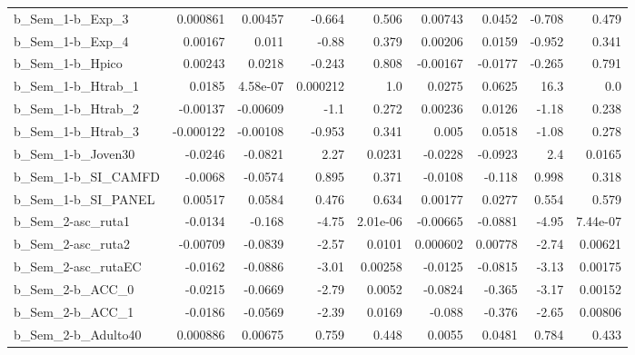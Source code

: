 \begin{tabular}{lrrrrrrrr}
b\_Sem\_1-b\_Exp\_3            &    0.000861 &      0.00457 &    -0.664 &    0.506 &    0.00743 &      0.0452 &       -0.708 &         0.479 \\
b\_Sem\_1-b\_Exp\_4            &     0.00167 &        0.011 &     -0.88 &    0.379 &    0.00206 &      0.0159 &       -0.952 &         0.341 \\
b\_Sem\_1-b\_Hpico            &     0.00243 &       0.0218 &    -0.243 &    0.808 &   -0.00167 &     -0.0177 &       -0.265 &         0.791 \\
b\_Sem\_1-b\_Htrab\_1          &      0.0185 &     4.58e-07 &  0.000212 &      1.0 &     0.0275 &      0.0625 &         16.3 &           0.0 \\
b\_Sem\_1-b\_Htrab\_2          &    -0.00137 &     -0.00609 &      -1.1 &    0.272 &    0.00236 &      0.0126 &        -1.18 &         0.238 \\
b\_Sem\_1-b\_Htrab\_3          &   -0.000122 &     -0.00108 &    -0.953 &    0.341 &      0.005 &      0.0518 &        -1.08 &         0.278 \\
b\_Sem\_1-b\_Joven30          &     -0.0246 &      -0.0821 &      2.27 &   0.0231 &    -0.0228 &     -0.0923 &          2.4 &        0.0165 \\
b\_Sem\_1-b\_SI\_CAMFD         &     -0.0068 &      -0.0574 &     0.895 &    0.371 &    -0.0108 &      -0.118 &        0.998 &         0.318 \\
b\_Sem\_1-b\_SI\_PANEL         &     0.00517 &       0.0584 &     0.476 &    0.634 &    0.00177 &      0.0277 &        0.554 &         0.579 \\
b\_Sem\_2-asc\_ruta1          &     -0.0134 &       -0.168 &     -4.75 & 2.01e-06 &   -0.00665 &     -0.0881 &        -4.95 &      7.44e-07 \\
b\_Sem\_2-asc\_ruta2          &    -0.00709 &      -0.0839 &     -2.57 &   0.0101 &   0.000602 &     0.00778 &        -2.74 &       0.00621 \\
b\_Sem\_2-asc\_rutaEC         &     -0.0162 &      -0.0886 &     -3.01 &  0.00258 &    -0.0125 &     -0.0815 &        -3.13 &       0.00175 \\
b\_Sem\_2-b\_ACC\_0            &     -0.0215 &      -0.0669 &     -2.79 &   0.0052 &    -0.0824 &      -0.365 &        -3.17 &       0.00152 \\
b\_Sem\_2-b\_ACC\_1            &     -0.0186 &      -0.0569 &     -2.39 &   0.0169 &     -0.088 &      -0.376 &        -2.65 &       0.00806 \\
b\_Sem\_2-b\_Adulto40         &    0.000886 &      0.00675 &     0.759 &    0.448 &     0.0055 &      0.0481 &        0.784 &         0.433 \\

\end{tabular}
